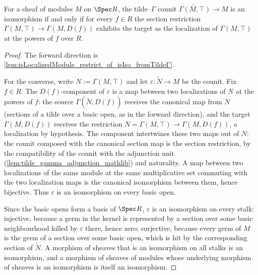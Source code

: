 \begin{lemma}
  \label{lem:isIso_fromTildeΓ_iff_isLocalizedModule_restrict}
  \leanok
  For a sheaf of modules \(M\) on \(\Spec R\), the tilde--\(\Gamma\) counit
  \(\widetilde{\Gamma(M, \top)} \to M\) is an isomorphism if and only if for every
  \(f \in R\) the section restriction \(\Gamma(M, \top) \to \Gamma(M, D(f))\) exhibits
  the target as the localization of \(\Gamma(M, \top)\) at the powers of \(f\) over
  \(R\).
\end{lemma}
\begin{proof}
  \leanok
  The forward direction is \cref{lem:isLocalizedModule_restrict_of_isIso_fromTildeΓ}.

  For the converse, write \(N := \Gamma(M, \top)\) and let
  \(\varepsilon : \widetilde{N} \to M\) be the counit. Fix \(f \in R\). The
  \(D(f)\)-component of \(\varepsilon\) is a map between two localizations of \(N\) at
  the powers of \(f\): the source \(\Gamma(\widetilde{N}, D(f))\) receives the canonical
  map from \(N\) (sections of a tilde over a basic open, as in the forward direction),
  and the target \(\Gamma(M, D(f))\) receives the restriction
  \(N = \Gamma(M, \top) \to \Gamma(M, D(f))\), a localization by hypothesis. The
  component intertwines these two maps out of \(N\): the counit composed with the
  canonical section map is the section restriction, by the compatibility of the counit
  with the adjunction unit (\cref{lem:tilde_gamma_adjunction_mathlib}) and naturality.
  A map between two localizations of the same module at the same multiplicative set
  commuting with the two localization maps is the canonical isomorphism between them,
  hence bijective. Thus \(\varepsilon\) is an isomorphism on every basic open.

  Since the basic opens form a basis of \(\Spec R\), \(\varepsilon\) is an isomorphism
  on every stalk: injective, because a germ in the kernel is represented by a section
  over some basic neighbourhood killed by \(\varepsilon\) there, hence zero; surjective,
  because every germ of \(M\) is the germ of a section over some basic open, which is
  hit by the corresponding section of \(\widetilde{N}\). A morphism of sheaves that is
  an isomorphism on all stalks is an isomorphism, and a morphism of sheaves of
  modules whose underlying morphism of sheaves is an isomorphism is itself an
  isomorphism.
\end{proof}

